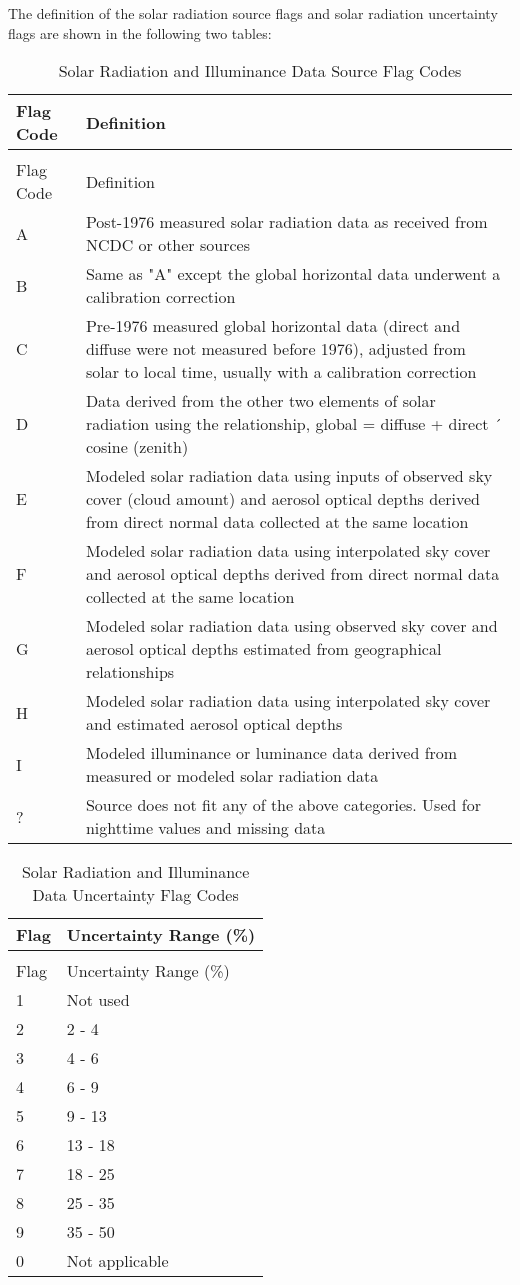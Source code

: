 The definition of the solar radiation source flags and solar radiation uncertainty flags are shown in the following two tables:

\begin{longtable}[c]{p{1.5in}p{4.5in}}
\caption{Solar Radiation and Illuminance Data Source Flag Codes \label{table:solar-radiation-and-illuminance-data-source}} \tabularnewline
\toprule 
Flag Code & Definition \tabularnewline
\midrule
\endfirsthead

\caption[]{Solar Radiation and Illuminance Data Source Flag Codes} \tabularnewline
\toprule 
Flag Code & Definition \tabularnewline
\midrule
\endhead

A & Post-1976 measured solar radiation data as received from NCDC or other sources \tabularnewline
B & Same as "A" except the global horizontal data underwent a calibration correction \tabularnewline
C & Pre-1976 measured global horizontal data (direct and diffuse were not measured before 1976), adjusted from solar to local time, usually with a calibration correction \tabularnewline
D & Data derived from the other two elements of solar radiation using the relationship, global = diffuse + direct ´ cosine (zenith) \tabularnewline
E & Modeled solar radiation data using inputs of observed sky cover (cloud amount) and aerosol optical depths derived from direct normal data collected at the same location \tabularnewline
F & Modeled solar radiation data using interpolated sky cover and aerosol optical depths derived from direct normal data collected at the same location \tabularnewline
G & Modeled solar radiation data using observed sky cover and aerosol optical depths estimated from geographical relationships \tabularnewline
H & Modeled solar radiation data using interpolated sky cover and estimated aerosol optical depths \tabularnewline
I & Modeled illuminance or luminance data derived from measured or modeled solar radiation data \tabularnewline
? & Source does not fit any of the above categories. Used for nighttime values and missing data \tabularnewline
\bottomrule
\end{longtable}

\begin{longtable}[c]{@{}ll@{}}
\caption{Solar Radiation and Illuminance Data Uncertainty Flag Codes \label{table:solar-radiation-and-illuminance-data}} \tabularnewline
\toprule 
Flag & Uncertainty Range (\%) \tabularnewline
\midrule
\endfirsthead

\caption[]{Solar Radiation and Illuminance Data Uncertainty Flag Codes} \tabularnewline
\toprule 
Flag & Uncertainty Range (\%) \tabularnewline
\midrule
\endhead

1 & Not used \tabularnewline
2 & 2 - 4 \tabularnewline
3 & 4 - 6 \tabularnewline
4 & 6 - 9 \tabularnewline
5 & 9 - 13 \tabularnewline
6 & 13 - 18 \tabularnewline
7 & 18 - 25 \tabularnewline
8 & 25 - 35 \tabularnewline
9 & 35 - 50 \tabularnewline
0 & Not applicable \tabularnewline
\bottomrule
\end{longtable}

